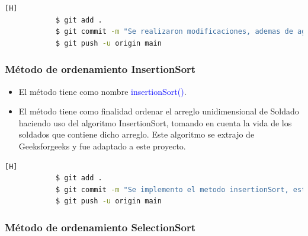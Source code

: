 \documentclass{article}
\begin{document}
        

        \begin{lstlisting}[language=bash,caption={Commit: Se implementó el método bubbleSort}][H]
    		$ git add .
    		$ git commit -m "Se realizaron modificaciones, ademas de agregar el metodo bubbleSort que ordenara el ejercito creado segun la vida de los soldados, este se mostrara con el metodo printArmyHealth que aun esta por implementarse"			
    		$ git push -u origin main
    	\end{lstlisting}
        
        \newpage
        \subsubsection{Método de ordenamiento InsertionSort}
        
        \begin{itemize}
            \item El método tiene como nombre \textcolor{blue}{insertionSort()}.
            \item El método tiene como finalidad ordenar el arreglo unidimensional de Soldado haciendo uso del algoritmo InsertionSort, tomando en cuenta la vida de los soldados que contiene dicho arreglo. Este algoritmo se extrajo de Geeksforgeeks y fue adaptado a este proyecto.
        \end{itemize}
        
        

        \begin{lstlisting}[language=bash,caption={Commit: Se implementó el método insertionSort}][H]
    		$ git add .
    		$ git commit -m "Se implemento el metodo insertionSort, este ordena el arreglo de soldados desde el que tenga mayor vida al menor, ademas de ello se modifico partes del codigo para que al mostrar los distintos datos pedidos sea de una forma mas organizada"			
    		$ git push -u origin main
    	\end{lstlisting}
        
        \newpage
        \subsubsection{Método de ordenamiento SelectionSort}
\end{document}
